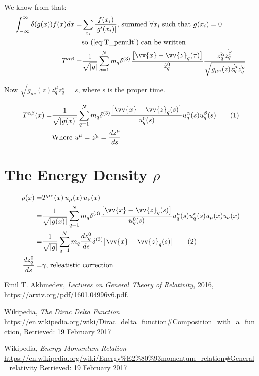 \documentclass[]{article}
\newcommand\numberthis{\addtocounter{equation}{1}\tag{\theequation}}
\begin{document}
We know from \cite{wiki_delta} that:
\begin{align*}
\int_{-\infty}^{\infty} \delta(g(x)) f(x) dx  =& \sum_{x_i} \frac{f(x_i)}{|g'(x_i)|} \text{, summed $ \forall x_i$ such that $g(x_i)=0$}\\
&\text{so (\ref{eq:T_penult}) can be written}\\
 T^{\alpha\beta} =& \frac{1}{\sqrt{|g|}} \sum_{q=1}^{N} m_q  \delta^{(3)} \frac{\big[\vv{x}-\vv{z}_q(\tau)\big]}{\dot{z}_q^0}\frac{\dot{z_q^\alpha}  \dot{z_q^\beta}}{\sqrt{g_{\mu\nu}(z)\dot{z_q^\mu}\dot{z_q^\nu}}}
\end{align*}


Now $\sqrt{g_{\mu\nu}(z)\dot{z_q^\mu}\dot{z_q^\nu}}=s$, where s is the proper time.

\begin{align*}
T^{\alpha\beta}(x) =& \frac{1}{\sqrt{|g(x)|}} \sum_{q=1}^{N} m_q \delta^{(3)} \frac{\big[\vv{x}-\vv{z}_q(s)\big]}{u_q^0 (s)} u_q^\alpha (s) u_q^\beta (s)  \numberthis \label{eq:T}\\
&\text{Where $u^{\mu} = \dot{z^\mu} = \frac{d z^\mu}{d s}$}
\end{align*}





\section{The Energy Density $\rho$}

\begin{align*}
\rho(x) =& T^{\mu\nu}(x) \, u_\mu(x) \, u_\nu(x)\\
=& \frac{1}{\sqrt{|g(x)|}} \sum_{q=1}^{N} m_q \delta^{(3)} \frac{\big[\vv{x}-\vv{z}_q(s)\big]}{u_q^0 (s)} u_q^\mu (s) u_q^\nu (s) u_\mu(x) u_\nu(x)\\
=&\frac{1}{\sqrt{|g|}} \sum_{q=1}^{N} m_q \frac{d z^0_q}{d s} \delta^{(3)} \big[\vv{x}-\vv{z}_q(s)\big] \numberthis \label{eq:density} \\
\frac{d z^0_q}{d s}=&\gamma \text{, releatistic correction}
\end{align*}


\begin{thebibliography}{9}
	
	Emil T. Akhmedev,
	\emph{Lectures on General Theory of Relativity},
	2016,
	\url{https://arxiv.org/pdf/1601.04996v6.pdf}.
	
	Wikipedia,
	\emph{The Dirac Delta Function}
	\url{https://en.wikipedia.org/wiki/Dirac_delta_function#Composition_with_a_function},
	Retrieved: 19 February 2017
	
	Wikipedia,
	\emph{Energy Momentum Relation}
	\url{https://en.wikipedia.org/wiki/Energy%E2%80%93momentum_relation#General_relativity}
		Retrieved: 19 February 2017
\end{thebibliography}
\end{document}
